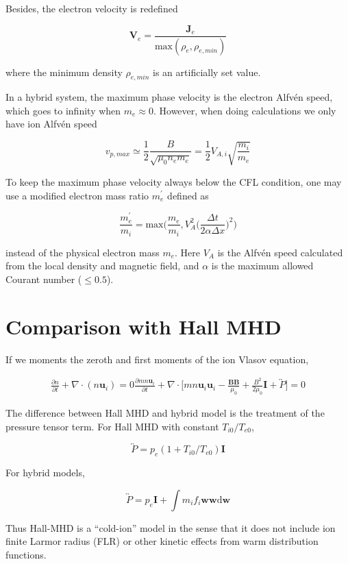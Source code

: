 \documentclass[
  notoc %
]{tufte-book}
\begin{document}
Besides, the electron velocity is redefined

\[
\mathbf{V}_e = \frac{\mathbf{J}_e}{\text{max}(\rho_e, \rho_{e,min})}
\]

where the minimum density \(\rho_{e,min}\) is an artificially set value.

In a hybrid system, the maximum phase velocity is the electron Alfvén
speed, which goes to infinity when \(m_e \approx 0\). However, when
doing calculations we only have ion Alfvén speed

\[
v_{p,max} \simeq \frac{1}{2}\frac{B}{\sqrt{\mu_0 n_e m_e}} = \frac{1}{2}V_{A,i} \sqrt{\frac{m_i}{m_e}}
\]

To keep the maximum phase velocity always below the CFL condition, one
may use a modified electron mass ratio \(m_e^\prime\) defined as

\[
\frac{m_e^\prime}{m_i}=\text{max}\Big( \frac{m_e}{m_i}, V_A^2\big( \frac{\Delta t}{2\alpha \Delta x} \big)^2 \Big)
\]

instead of the physical electron mass \(m_e\). Here \(V_A\) is the
Alfvén speed calculated from the local density and magnetic field, and
\(\alpha\) is the maximum allowed Courant number (\(\le 0.5\)).

\hypertarget{comparison-with-hall-mhd}{%
\section{Comparison with Hall MHD}\label{comparison-with-hall-mhd}}

If we moments the zeroth and first moments of the ion Vlasov equation,

\[
\begin{aligned}
\frac{\partial n}{\partial t} + \nabla\cdot(n\mathbf{u}_i) = 0
\frac{\partial mn\mathbf{u}_i}{\partial t} + \nabla\cdot\Big[ mn\mathbf{u}_i\mathbf{u}_i - \frac{\mathbf{B}\mathbf{B}}{\mu_0} + \frac{B^2}{2\mu_0}\mathbf{I} + \overleftrightarrow{P} \Big] = 0
\end{aligned}
\]

The difference between Hall MHD and hybrid model is the treatment of the
pressure tensor term. For Hall MHD with constant \(T_{i0}/T_{e0}\),

\[
\overleftrightarrow{P} = p_e(1 + T_{i0}/T_{e0})\mathbf{I}
\]

For hybrid models,

\[
\overleftrightarrow{P} = p_e\mathbf{I} + \int m_i f_i \mathbf{w}\mathbf{w}\mathrm{d}\mathbf{w}
\]

Thus Hall-MHD is a ``cold-ion'' model in the sense that it does not
include ion finite Larmor radius (FLR) or other kinetic effects from
warm distribution functions.
\end{document}
